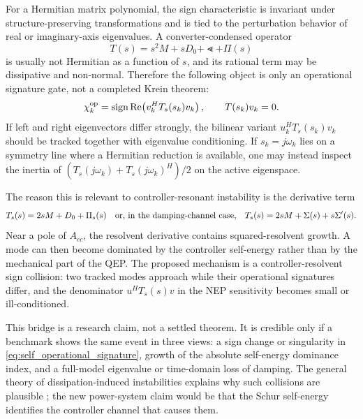 For a Hermitian matrix polynomial, the sign characteristic is invariant under
structure-preserving transformations and is tied to the perturbation behavior of
real or imaginary-axis eigenvalues. A converter-condensed operator
\[
  T(s)=s^2M+sD_0+\Lt+\Pi(s)
\]
is usually not Hermitian as a function of \(s\), and its rational term may be
dissipative and non-normal. Therefore the following object is only an
operational signature gate, not a completed Krein theorem:
\begin{equation}
  \chi_k^{\rm op}
  =
  \operatorname{sign}
  \operatorname{Re}\!\left(v_k^H T_s(s_k)v_k\right),
  \qquad
  T(s_k)v_k=0.
  \label{eq:self_operational_signature}
\end{equation}
If left and right eigenvectors differ strongly, the bilinear variant
\(u_k^H T_s(s_k)v_k\) should be tracked together with eigenvalue conditioning.
If \(s_k=j\omega_k\) lies on a symmetry line where a Hermitian reduction is
available, one may instead inspect the inertia of
\((T_s(j\omega_k)+T_s(j\omega_k)^H)/2\) on the active eigenspace.

The reason this is relevant to controller-resonant instability is the derivative
term
\[
  T_s(s)=2sM+D_0+\Pi_s(s)
  \quad
  \hbox{or, in the damping-channel case,}\quad
  T_s(s)=2sM+\Sigma(s)+s\Sigma'(s).
\]
Near a pole of \(A_{cc}\), the resolvent derivative contains squared-resolvent
growth. A mode can then become dominated by the controller self-energy rather
than by the mechanical part of the QEP. The proposed mechanism is a
controller-resolvent sign collision: two tracked modes approach while their
operational signatures differ, and the denominator
\(u^H T_s(s)v\) in the NEP sensitivity becomes small or ill-conditioned.

This bridge is a research claim, not a settled theorem. It is credible only if a
benchmark shows the same event in three views: a sign change or singularity in
\eqref{eq:self_operational_signature}, growth of the absolute self-energy
dominance index, and a full-model eigenvalue or time-domain loss of damping. The
general theory of dissipation-induced instabilities explains why such collisions
are plausible \cite{krechetnikov2007dissipation}; the new power-system claim
would be that the Schur self-energy identifies the controller channel that
causes them.
